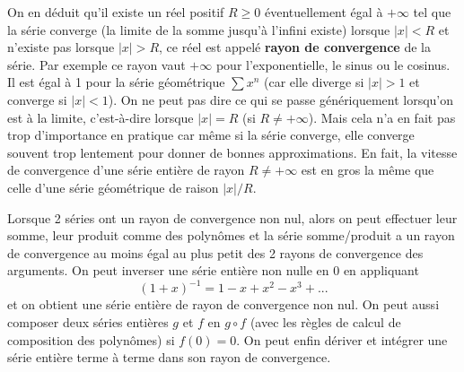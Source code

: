 \documentclass[a4paper,11pt]{article}
\begin{document}
\begin{giacjshere}
On en d\'eduit qu'il existe un réel
positif $R\geq 0$ éventuellement égal à $+\infty$ tel que 
la s\'erie converge (la limite de la somme jusqu'\`a l'infini existe) 
lorsque $|x|<R$ et n'existe pas lorsque
$|x|>R$, ce réel est appelé {\bf rayon de convergence} de la série.
Par exemple ce rayon vaut $+\infty$ pour l'exponentielle, le sinus
ou le cosinus. Il
est égal à 1 pour la série géométrique $\sum x^n$ (car elle diverge
si $|x|>1$ et converge si $|x|<1$). 
On ne peut pas dire ce qui se passe g\'en\'eriquement lorsqu'on
est \`a la limite, c'est-\`a-dire lorsque $|x|=R$ (si $R\neq
+\infty$). Mais cela n'a en fait pas trop d'importance en pratique
car m\^eme si la s\'erie converge, elle converge souvent trop lentement
pour donner de bonnes approximations. En fait, la vitesse de
convergence d'une s\'erie enti\`ere de rayon $R\neq +\infty$ est
en gros la m\^eme que celle d'une s\'erie g\'eom\'etrique de raison $|x|/R$.

Lorsque 2 séries ont un rayon de convergence non nul, alors on
peut effectuer leur somme, leur produit comme des polynômes et la
série somme/produit a un rayon de convergence au moins égal au plus
petit des 2 rayons de convergence des arguments. On peut inverser une série
entière non nulle en 0 en appliquant 
\[ (1+x)^{-1} = 1-x+x^2-x^3+... \]
et on obtient une série entière de rayon de
convergence non nul. On peut aussi composer deux séries entières
$g$ et $f$ en $g\circ f$ (avec les r\`egles de calcul de composition
des polyn\^omes) si $f(0)=0$. On peut enfin dériver
et intégrer une série entière terme à terme dans son rayon de convergence.


\end{giacjshere}
\end{document}
